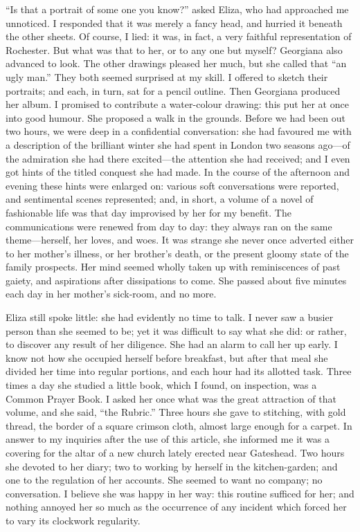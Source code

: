 \enquote{Is that a portrait of some one you know?} asked Eliza, who had
approached me unnoticed. I responded that it was merely a fancy head,
and hurried it beneath the other sheets. Of course, I lied: it was, in
fact, a very faithful representation of \Mr{} Rochester. But what was
that to her, or to any one but myself? Georgiana also advanced to
look. The other drawings pleased her much, but she called that
\enquote{an ugly man.} They both seemed surprised at my skill. I
offered to sketch their portraits; and each, in turn, sat for a pencil
outline. Then Georgiana produced her album. I promised to contribute a
water-colour drawing: this put her at once into good humour. She
proposed a walk in the grounds. Before we had been out two hours, we
were deep in a confidential conversation: she had favoured me with a
description of the brilliant winter she had spent in London two seasons
ago---of the admiration she had there excited---the attention she had
received; and I even got hints of the titled conquest she had made. In
the course of the afternoon and evening these hints were enlarged on:
various soft conversations were reported, and sentimental scenes
represented; and, in short, a volume of a novel of fashionable life was
that day improvised by her for my benefit. The communications were
renewed from day to day: they always ran on the same theme---herself,
her loves, and woes. It was strange she never once adverted either to
her mother's illness, or her brother's death, or the present gloomy
state of the family prospects. Her mind seemed wholly taken up with
reminiscences of past gaiety, and aspirations after dissipations to
come. She passed about five minutes each day in her mother's sick-room,
and no more.

Eliza still spoke little: she had evidently no time to talk. I never
saw a busier person than she seemed to be; yet it was difficult to say
what she did: or rather, to discover any result of her diligence. She
had an alarm to call her up early. I know not how she occupied herself
before breakfast, but after that meal she divided her time into regular
portions, and each hour had its allotted task. Three times a day she
studied a little book, which I found, on inspection, was a Common Prayer
Book. I asked her once what was the great attraction of that volume,
and she said, \enquote{the Rubric.} Three hours she gave to stitching,
with gold thread, the border of a square crimson cloth, almost large
enough for a carpet. In answer to my inquiries after the use of this
article, she informed me it was a covering for the altar of a new church
lately erected near Gateshead. Two hours she devoted to her diary; two
to working by herself in the kitchen-garden; and one to the regulation
of her accounts. She seemed to want no company; no conversation. I
believe she was happy in her way: this routine sufficed for her; and
nothing annoyed her so much as the occurrence of any incident which
forced her to vary its clockwork regularity.

